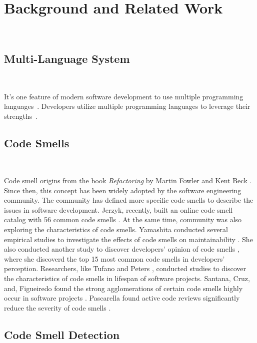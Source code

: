 \section{Background and Related Work}~\label{sec:background}

\subsection{Multi-Language System}~\label{sec:Multi-Language System}

It's one feature of modern software development to use multiple programming
languages~\cite{723183}. Developers utilize multiple programming languages to
leverage their strengths~\cite{7476675}.

\subsection{Code Smells}~\label{sec:Code Smells}

Code smell origins from the book \textit{Refactoring} by Martin Fowler and Kent
Beck \cite{Fowler_Beck}. Since then, this concept has been widely adopted by the
software engineering community. The community has defined more specific code
smells \cite{Pysmell,SQLAntipatterns,CleanCode,RefactoringWorkbook} to describe
the issues in software development. Jerzyk, recently, built an online code smell
catalog with 56 common code smells \cite{Jerzyk2023}. At the same time,
community was also exploring the characteristics of code smells. Yamashita
conducted several empirical studies to investigate the effects of code smells on
maintainability \cite{6392174} \cite{6405287}. She also conducted another study
to discover developers' opinion of code smells \cite{developersCare}, where she
discoverd the top 15 most common code smells in developers' perception.
Researchers, like Tufano \cite{whenandwhy} and Peters \cite{lifespan}, conducted
studies to discover the characteristics of code smells in lifespan of software
projects. Santana, Cruz, and, Figueiredo found the strong agglomerations of
certain code smells highly occur in software projects \cite{Santana}. Pascarella
found active code reviews significantly reduce the severity of code smells
\cite{Pascarella}.

\subsection{Code Smell Detection}~\label{sec:Code Smell Detection}

